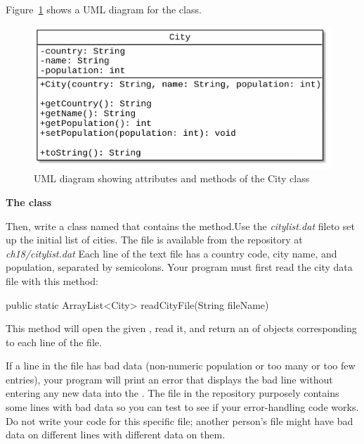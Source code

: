 \begin{exercise}
Figure~\ref{fig.ch18.cityUML} shows a UML diagram for the  class.

\begin{figure}[!h]
\begin{center}
\includegraphics[scale=0.75]{figs/ch18/city.pdf}
\caption{UML diagram showing attributes and methods of the City class}
\label{fig.ch18.cityUML}
\end{center}
\end{figure}


{\large\bf{The  class}}

Then, write a class named  that contains the  method.Use the {\em citylist.dat} file\footnotemark to set up the initial list of cities. The file is available from the repository at {\em ch18/citylist.dat} Each line of the text file has a country code, city name, and population, separated by semicolons. Your program must first read the city data file with this method:


\begin{stdout}
public static ArrayList<City> readCityFile(String fileName)
\end{stdout}

This method will open the given , read it, and return an  of  objects corresponding to each line of the file.

If a line in the file has bad data (non-numeric population or too many or too few entries), your program will print an error that displays the bad line without entering any new data into the . The  file in the repository purposely contains some lines with bad data so you can test to see if your error-handling code works. Do not write your code for this specific file; another person's file might have bad data on different lines with different data on them.


\end{exercise}
